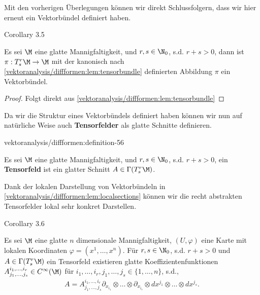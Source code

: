 \documentclass[letterpaper,10pt,english]{jupyterBook}
\begin{document}
\par
Mit den vorherigen Überlegungen können wir direkt Schlussfolgern, dass wir hier erneut ein Vektorbündel definiert haben.
\label{vektoranalysis/diffformen:corollary-55}
\begin{emphBox}{}{}{Corollary 3.5}



\par
Es sei \(\M\) eine glatte Mannigfaltigkeit, und \(r,s\in\N_0\), s.d. \(r+s>0\), dann ist \(\pi:T^r_s\M\to\M\) mit der kanonisch nach \cref{vektoranalysis/diffformen:lem:tensorbundle} definierten Abbildung \(\pi\) ein Vektorbündel.
\end{emphBox}

\begin{proof}
 Folgt direkt aus \cref{vektoranalysis/diffformen:lem:tensorbundle} 
\end{proof}

\par
Da wir die Struktur eines Vektorbündels definiert haben können wir nun auf natürliche Weise auch \textbf{Tensorfelder} als glatte Schnitte definieren.
\begin{definition}{}{vektoranalysis/diffformen:definition-56}



\par
Es sei \(\M\) eine glatte Mannigfaltigkeit, und \(r,s\in\N_0\), s.d. \(r+s>0\), ein \textbf{Tensorfeld} ist ein glatter Schnitt \(A\in \Gamma(T^r_s\M)\).
\end{definition}

\par
Dank der lokalen Darstellung von Vektorbündeln in \cref{vektoranalysis/diffformen:lem:localsections} können wir die recht abstrakten Tensorfelder lokal sehr konkret Darstellen.
\label{vektoranalysis/diffformen:corollary-57}
\begin{emphBox}{}{}{Corollary 3.6}



\par
Es sei \(\M\) eine glatte \(n\) dimensionale Mannigfaltigkeit, \((U,\varphi)\) eine Karte mit lokalen Koordinaten \(\varphi=(x^1,\ldots,x^n)\). Für \(r,s\in\N_0\), s.d. \(r+s>0\) und \(A\in \Gamma(T^r_s\M)\) ein Tensorfeld existieren glatte Koeffizientenfunktionen \(A^{i_1,\ldots, i_r}_{j_1,\ldots,j_s}\in C^\infty(\M)\) für \(i_1,\ldots, i_r, j_1,\ldots, j_s\in \{1,\ldots,n\}\), s.d.,
\begin{align*}
A = A^{i_1,\ldots,i_r}_{j_1,\ldots,j_s} \partial_{x_{i_1}}\otimes\ldots\otimes \partial_{x_{i_r}}\otimes dx^{j_1}\otimes\ldots\otimes dx^{j_s}.
\end{align*}\end{emphBox}
\end{document}
